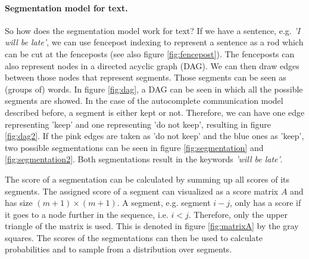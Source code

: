 \paragraph{Segmentation model for text.}
So how does the segmentation model work for text? 
If we have a sentence, e.g. \textit{'I will be late'}, we can use fencepost indexing to represent a sentence as a rod which can be cut at the fenceposts (see also figure \ref{fig:fencepost}).
The fenceposts can also represent nodes in a directed acyclic graph (DAG). 
We can then draw edges between those nodes that represent segments. 
Those segments can be seen as (groups of) words. 
In figure \ref{fig:dag}, a DAG can be seen in which all the possible segments are showed. 
In the case of the autocomplete communication model described before, a segment is either kept or not.
Therefore, we can have one edge representing 'keep' and one representing 'do not keep', resulting in figure \ref{fig:dag2}.
If the pink edges are taken as 'do not keep' and the blue ones as 'keep', two possible segmentations can be seen in figure \ref{fig:segmentation} and \ref{fig:segmentation2}. 
Both segmentations result in the keywords \textit{'will be late'}. 

The score of a segmentation can be calculated by summing up all scores of its segments.
The assigned score of a segment can visualized as a score matrix $A$ and has size $(m+1) \times (m+1)$. 
A segment, e.g. segment $i-j$, only has a score if it goes to a node further in the sequence, i.e. $i < j$.
Therefore, only the upper triangle of the matrix is used. 
This is denoted in figure \ref{fig:matrixA} by the gray squares.
The scores of the segmentations can then be used to calculate probabilities and to sample from a distribution over segments.

